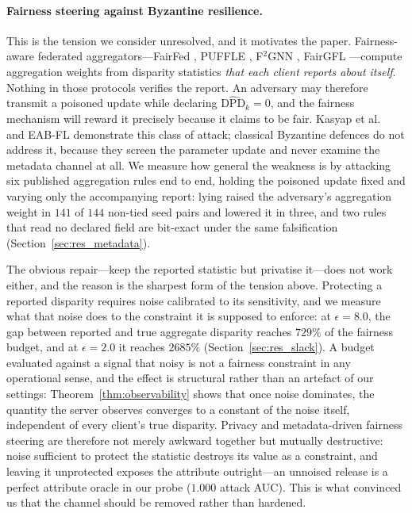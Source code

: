 \documentclass[preprint,12pt]{elsarticle}
\theoremstyle{plain}
\theoremstyle{definition}
\theoremstyle{remark}
\newcommand{\dpd}{\mathrm{DPD}}
\begin{document}
\paragraph{Fairness steering against Byzantine resilience.} This is the tension we consider unresolved, and it motivates the paper. Fairness-aware federated aggregators---FairFed \cite{ezzeldin2023fairfed}, PUFFLE \cite{corbucci2024puffle}, F$^2$GNN \cite{f2gnn2023}, FairGFL \cite{fairgfl2026}---compute aggregation weights from disparity statistics \emph{that each client reports about itself}. Nothing in those protocols verifies the report. An adversary may therefore transmit a poisoned update while declaring $\widehat{\dpd}_k = 0$, and the fairness mechanism will reward it precisely because it claims to be fair. Kasyap et al.\ \cite{kasyap2025attack} and EAB-FL \cite{eabfl2024} demonstrate this class of attack; classical Byzantine defences \cite{blanchard2017krum,yin2018byzantine,cao2021fltrust} do not address it, because they screen the parameter update and never examine the metadata channel at all. We measure how general the weakness is by attacking six published aggregation rules end to end, holding the poisoned update fixed and varying only the accompanying report: lying raised the adversary's aggregation weight in $141$ of $144$ non-tied seed pairs and lowered it in three, and two rules that read no declared field are bit-exact under the same falsification (Section~\ref{sec:res_metadata}).

The obvious repair---keep the reported statistic but privatise it---does not work either, and the reason is the sharpest form of the tension above. Protecting a reported disparity requires noise calibrated to its sensitivity, and we measure what that noise does to the constraint it is supposed to enforce: at $\epsilon = 8.0$, the gap between reported and true aggregate disparity reaches $729\%$ of the fairness budget, and at $\epsilon = 2.0$ it reaches $2685\%$ (Section~\ref{sec:res_slack}). A budget evaluated against a signal that noisy is not a fairness constraint in any operational sense, and the effect is structural rather than an artefact of our settings: Theorem~\ref{thm:observability} shows that once noise dominates, the quantity the server observes converges to a constant of the noise itself, independent of every client's true disparity. Privacy and metadata-driven fairness steering are therefore not merely awkward together but mutually destructive: noise sufficient to protect the statistic destroys its value as a constraint, and leaving it unprotected exposes the attribute outright---an unnoised release is a perfect attribute oracle in our probe ($1.000$ attack AUC). This is what convinced us that the channel should be removed rather than hardened.
\end{document}
